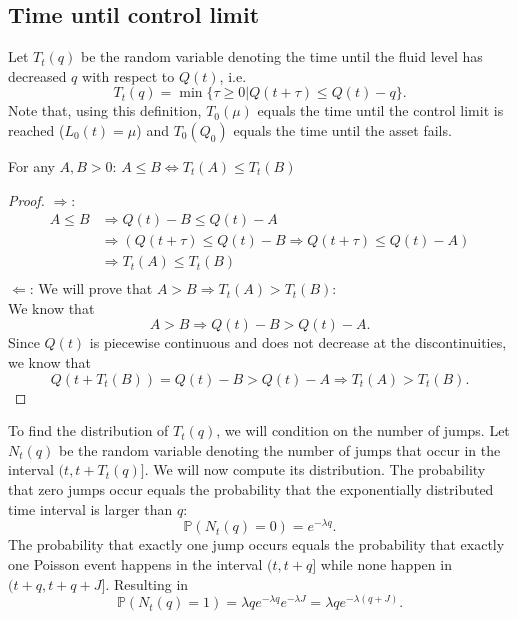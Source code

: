 \subsection{Time until control limit}
Let $T_t(q)$ be the random variable denoting the time until the fluid level has decreased $q$ with respect to $Q(t)$, i.e.
$$
T_t(q)=\min\{\tau\geq0|Q(t+\tau)\leq Q(t)-q\}.
$$
Note that, using this definition, $T_0(\mu)$ equals the time until the control limit is reached ($L_0(t)=\mu$) and $T_0(Q_0)$ equals the time until the asset fails.
\begin{lemma}\label{lemma:TimeUntilFluidLemma}
	For any $A,B>0$:
	$A\leq B\Leftrightarrow T_t(A)\leq T_t(B)$
	\begin{proof}
		$\Rightarrow$: 
		\[\begin{split}
		A\leq B&\Rightarrow Q(t)-B\leq Q(t)-A\\
		&\Rightarrow (Q(t+\tau)\leq Q(t)-B\Rightarrow Q(t+\tau)\leq Q(t)-A)\\
		&\Rightarrow T_t(A)\leq T_t(B)\\
		\end{split}\]
		$\Leftarrow$: We will prove that $A>B\Rightarrow T_t(A)> T_t(B)$:\\
		We know that
		$$
		A>B\Rightarrow Q(t)-B > Q(t)-A.
		$$
		Since $Q(t)$ is piecewise continuous and does not decrease at the discontinuities, we know that 
		$$
		Q(t+T_t(B))=Q(t)-B>Q(t)-A\Rightarrow T_t(A)> T_t(B).
		$$
	\end{proof}
\end{lemma}
To find the distribution of $T_t(q)$, we will condition on the number of jumps.
Let $N_t(q)$ be the random variable denoting the number of jumps that occur in the interval $(t,t+T_t(q)]$.
We will now compute its distribution.
The probability that zero jumps occur equals the probability that the exponentially distributed time interval is larger than $q$:
$$
\mathbb{P}(N_t(q)=0)=e^{-\lambda q}.
$$
The probability that exactly one jump occurs equals the probability that exactly one Poisson event happens in the interval $(t,t+q]$ while none happen in $(t+q,t+q+J]$. Resulting in
\begin{equation}\label{eq:AgeBasedNumJumpProb1}
\mathbb{P}(N_t(q)=1)=\lambda q e^{-\lambda q} e^{-\lambda J}=\lambda q e^{-\lambda (q+J)}.
\end{equation}

